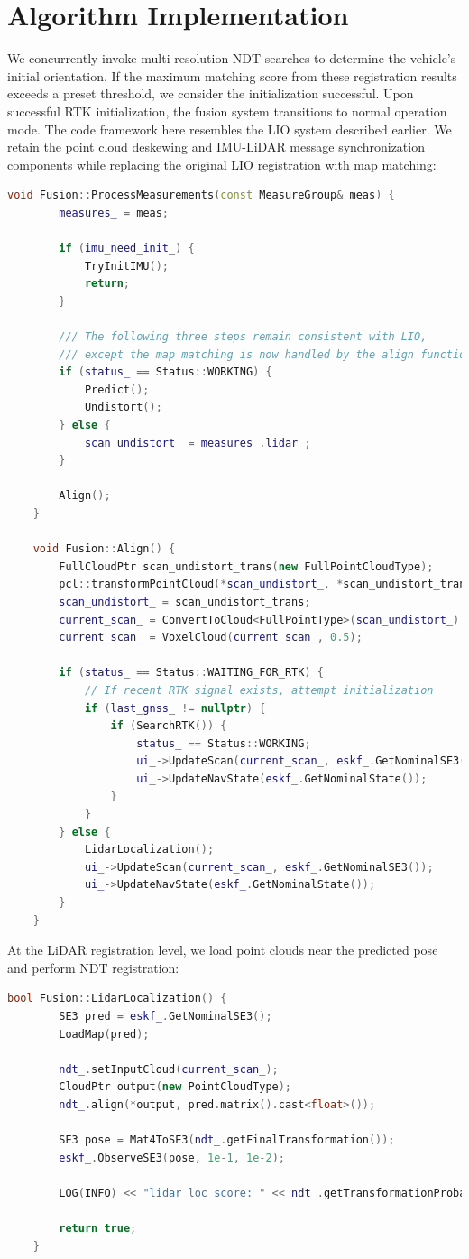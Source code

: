 \section{Algorithm Implementation}
We concurrently invoke multi-resolution NDT searches to determine the vehicle's initial orientation. If the maximum matching score from these registration results exceeds a preset threshold, we consider the initialization successful. Upon successful RTK initialization, the fusion system transitions to normal operation mode. The code framework here resembles the LIO system described earlier. We retain the point cloud deskewing and IMU-LiDAR message synchronization components while replacing the original LIO registration with map matching:

\begin{lstlisting}[language=c++,caption=/ch10/fusion.cc]
	void Fusion::ProcessMeasurements(const MeasureGroup& meas) {
		measures_ = meas;
		
		if (imu_need_init_) {
			TryInitIMU();
			return;
		}
		
		/// The following three steps remain consistent with LIO, 
		/// except the map matching is now handled by the align function
		if (status_ == Status::WORKING) {
			Predict();
			Undistort();
		} else {
			scan_undistort_ = measures_.lidar_;
		}
		
		Align();
	}
	
	void Fusion::Align() {
		FullCloudPtr scan_undistort_trans(new FullPointCloudType);
		pcl::transformPointCloud(*scan_undistort_, *scan_undistort_trans, TIL_.matrix());
		scan_undistort_ = scan_undistort_trans;
		current_scan_ = ConvertToCloud<FullPointType>(scan_undistort_);
		current_scan_ = VoxelCloud(current_scan_, 0.5);
		
		if (status_ == Status::WAITING_FOR_RTK) {
			// If recent RTK signal exists, attempt initialization
			if (last_gnss_ != nullptr) {
				if (SearchRTK()) {
					status_ == Status::WORKING;
					ui_->UpdateScan(current_scan_, eskf_.GetNominalSE3());
					ui_->UpdateNavState(eskf_.GetNominalState());
				}
			}
		} else {
			LidarLocalization();
			ui_->UpdateScan(current_scan_, eskf_.GetNominalSE3());
			ui_->UpdateNavState(eskf_.GetNominalState());
		}
	}
\end{lstlisting}

At the LiDAR registration level, we load point clouds near the predicted pose and perform NDT registration:

\begin{lstlisting}[language=c++,caption=/ch10/fusion.cc]
	bool Fusion::LidarLocalization() {
		SE3 pred = eskf_.GetNominalSE3();
		LoadMap(pred);
		
		ndt_.setInputCloud(current_scan_);
		CloudPtr output(new PointCloudType);
		ndt_.align(*output, pred.matrix().cast<float>());
		
		SE3 pose = Mat4ToSE3(ndt_.getFinalTransformation());
		eskf_.ObserveSE3(pose, 1e-1, 1e-2);
		
		LOG(INFO) << "lidar loc score: " << ndt_.getTransformationProbability();
		
		return true;
	}
\end{lstlisting}

